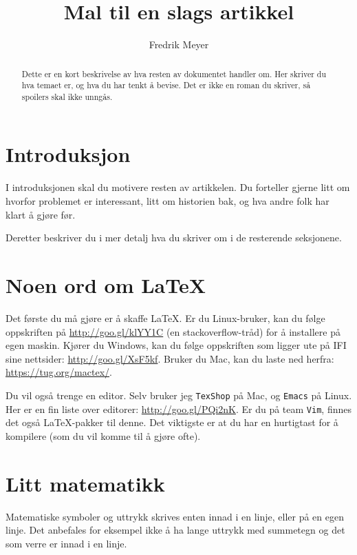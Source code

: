 \documentclass[11pt, english, a4paper]{article}
\begin{document}
\title{Mal til en slags artikkel}
\author{Fredrik Meyer}
\maketitle 

\begin{abstract}
\noindent
Dette er en kort beskrivelse av hva resten av dokumentet handler om. Her skriver du hva temaet er, og hva du har tenkt å bevise. Det er ikke en roman du skriver, så spoilers skal ikke unngås.
\end{abstract}

\section{Introduksjon}

I introduksjonen skal du motivere resten av artikkelen. Du forteller gjerne litt om hvorfor problemet er interessant, litt om historien bak, og hva andre folk har klart å gjøre før.

Deretter beskriver du i mer detalj hva du skriver om i de resterende seksjonene. 

\section{Noen ord om \LaTeX}

Det første du må gjøre er å skaffe \LaTeX. Er du Linux-bruker, kan du følge oppskriften på \url{http://goo.gl/klYY1C} (en stackoverflow-tråd) for å installere på egen maskin. Kjører du Windows, kan du følge oppskriften som ligger ute på IFI sine nettsider: \url{http://goo.gl/XsF5kf}. Bruker du Mac, kan du laste ned herfra: \url{https://tug.org/mactex/}.

Du vil også trenge en editor. Selv bruker jeg \texttt{TexShop} på Mac, og \texttt{Emacs} på Linux. Her er en fin liste over editorer: \url{http://goo.gl/PQi2nK}. Er du på team \texttt{Vim}, finnes det også \LaTeX-pakker til denne. Det viktigste er at du har en hurtigtast for å kompilere (som du vil komme til å gjøre ofte).


\section{Litt matematikk}

Matematiske symboler og uttrykk skrives enten innad i en linje, eller på en egen linje. Det anbefales for eksempel ikke å ha lange uttrykk med summetegn og det som verre er innad i en linje.
\end{document}
